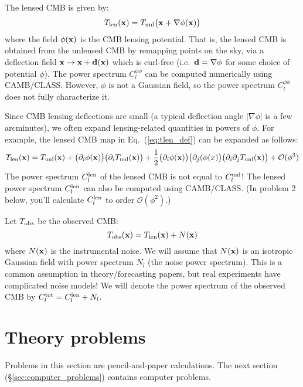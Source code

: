 \documentclass[aps,prd,superscriptaddress,groupedaddress,nofootinbib,nobibnotes]{revtex4}
\newcommand{\be}{\begin{equation}}
\newcommand{\ee}{\end{equation}}
\newcommand{\bigoh}{\mathcal{O}}
\def\x{{\bf x}}
\begin{document}
The lensed CMB is given by:
\be
T_{\rm len}(\x) = T_{\rm unl}\big( \x + \nabla\phi(\x) \big)  \label{eq:tlen_def}
\ee
where the field $\phi(\x)$ is the CMB lensing potential.
That is, the lensed CMB is obtained from the unlensed CMB by remapping points
on the sky, via a deflection field $\x \rightarrow \x + {\bf d}(\x)$ which is
curl-free (i.e.~${\bf d} = \nabla\phi$ for some choice of potential $\phi$).
The power spectrum $C_l^{\phi\phi}$ can be computed numerically
using CAMB/CLASS.  However, $\phi$ is not a Gaussian field,
so the power spectrum $C_l^{\phi\phi}$ does not fully
characterize it.

Since CMB lensing deflections are small (a typical deflection
angle $|\nabla\phi|$ is a few arcminutes), we often expand lensing-related
quantities in powers of $\phi$.  For example, the lensed CMB map in Eq.~(\ref{eq:tlen_def}) can be
expanded as follows:
\be
T_{\rm len}(\x) = T_{\rm unl}(\x) + \big( \partial_i\phi(\x) \big) \big( \partial_i T_{\rm unl}(\x) \big)
 + \frac{1}{2} \big( \partial_i\phi(\x) \big) \big( \partial_j(\phi(x) \big) \big(\partial_i \partial_j T_{\rm unl}(\x)\big)
 + \bigoh(\phi^3)
\ee
The power spectrum $C_l^{\rm len}$ of the lensed CMB is not equal
to $C_l^{\rm unl}$!  The lensed power spectrum $C_l^{\rm len}$ can also be computed
using CAMB/CLASS.  (In problem 2 below, you'll calculate $C_l^{\rm len}$
to order $\bigoh(\phi^2)$.)

Let $T_{\rm obs}$ be the observed CMB:
\be
T_{\rm obs}(\x) = T_{\rm len}(\x) + N(\x)
\ee
where $N(\x)$ is the instrumental noise.  We will assume that $N(\x)$ is an isotropic
Gaussian field with power spectrum $N_l$ (the noise power spectrum).  This is a common
assumption in theory/forecasting papers, but real experiments have complicated noise models!
We will denote the power spectrum of the observed CMB by $C_l^{\rm tot} = C_l^{\rm len} + N_l$.

\section{Theory problems}
\label{sec:theory_problems}

\par\noindent
Problems in this section are pencil-and-paper calculations.  The next section (\S\ref{sec:computer_problems}) contains computer problems.
\end{document}
